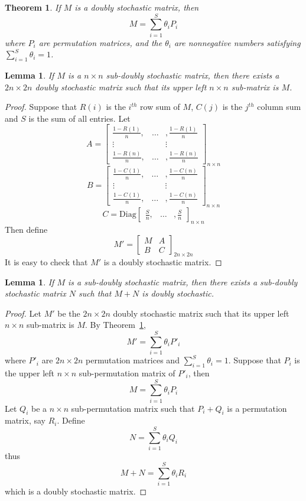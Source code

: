 \documentclass[12pt]{amsart}
\newtheorem{lem}[thm]{Lemma}
\newtheorem{thmofothers}{Theorem}
\begin{document}
\begin{thmofothers}
\label{t double stoch}
If $M$ is a doubly stochastic matrix, then
\[ M=\sum_{i=1}^S \theta_iP_i\]
where $P_i$ are permutation matrices, and the $\theta _i$ are
nonnegative numbers satisfying $\sum_{i=1}^S \theta _i =1$.
\end{thmofothers}
\bigskip

\begin{lem}
\label{l 2nx2n}
If $M$ is a $n\times n$ sub-doubly stochastic matrix,
then there exists a
$2n\times 2n$ doubly stochastic matrix such that its upper left
$n\times n$ sub-matrix is $M$.
\end{lem}

\begin{proof} Suppose that $R(i)$ is the $i^{th}$ row sum of $M$,
$C(j)$ is the $j^{th}$ column sum and $S$ is the sum of all
entries. Let
\[A=\left[\begin{array}{ccc} \frac{1-R(1)}{n}, &\dots& ,\frac{1-R(1)}{n} \\
\vdots & & \vdots \\ \frac{1-R(n)}{n}, &\dots&
,\frac{1-R(n)}{n}\end{array}\right]_{n\times n}\]
\[B=\left[\begin{array}{ccc} \frac{1-C(1)}{n}, &\dots& ,\frac{1-C(n)}{n} \\
\vdots & & \vdots \\ \frac{1-C(1)}{n}, &\dots&
,\frac{1-C(n)}{n}\end{array}\right]_{n\times n}\]
\[C= \mbox{Diag}\left[\begin{array}{ccc} \frac{S}{n}, &\dots& ,\frac{S}{n}
\end{array}\right]_{n\times n}\]
Then define
\[M'=\left[\begin{array}{cc} M & A \\
B & C \end{array}\right]_{2n\times 2n}\] It is easy to check that
$M'$ is a doubly stochastic matrix.
\end{proof}

\begin{lem}
\label{l M+N}
If $M$ is a sub-doubly stochastic matrix, then there exists a sub-doubly
stochastic matrix $N$ such that $M+N$ is doubly stochastic.
\end{lem}

\begin{proof}
Let $M'$ be the $2n\times 2n$ doubly stochastic matrix such that
its upper left $n\times n$ sub-matrix is $M$. By Theorem~\ref{t double stoch},
\[ M'=\sum_{i=1}^S \theta_iP'_i\]
where $P'_i$ are $2n\times 2n$ permutation matrices and
$\sum_{i=1}^S \theta _i =1$. Suppose that $P_i$ is the upper left
$n\times n$ sub-permutation matrix of $P'_i$, then
\[ M=\sum_{i=1}^S \theta_iP_i\]
Let $Q_i$ be a $n\times n$ sub-permutation matrix such that
$P_i+Q_i$ is a permutation matrix, say $R_i$. Define
\[N=\sum_{i=1}^S \theta _iQ_i\]
thus \[M+N =\sum_{i=1}^S \theta _i R_i\] which is a doubly
stochastic matrix.
\end{proof}
\end{document}
